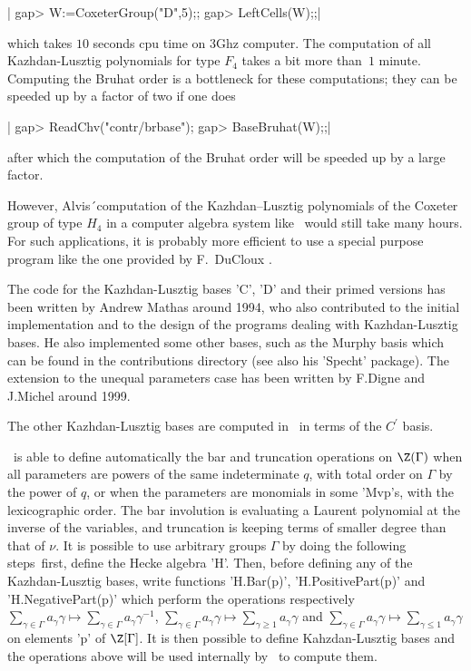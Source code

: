 |    gap> W:=CoxeterGroup("D",5);;
    gap> LeftCells(W);;|

which  takes $10$ seconds cpu time on 3Ghz computer. The computation of all
Kazhdan-Lusztig  polynomials  for  type  $F_4$  takes  a  bit more than~$1$
minute.  Computing the Bruhat order is a bottleneck for these computations;
they can be speeded up by a factor of two if one does\:

|    gap> ReadChv("contr/brbase");
    gap> BaseBruhat(W);;|

after  which the computation  of the Bruhat  order will be  speeded up by a
large factor.

However,  Alvis\'\ computation  of the  Kazhdan--Lusztig polynomials of the
Coxeter  group of type $H_4$ in a  computer algebra system like \GAP\ would
still take many hours. For such applications, it is probably more efficient
to  use a  special purpose  program like  the one  provided by  F.\ DuCloux
\cite{DuC91}.

The  code for the Kazhdan-Lusztig bases  'C', 'D' and their primed versions
has  been written by Andrew Mathas around 1994, who also contributed to the
initial  implementation  and  to  the  design  of the programs dealing with
Kazhdan-Lusztig  bases. He also  implemented some other  bases, such as the
Murphy  basis which can  be found in  the contributions directory (see also
his  'Specht' package).  The extension  to the  unequal parameters case has
been written by F.Digne and J.Michel around 1999.

The  other Kazhdan-Lusztig bases  are computed in  \CHEVIE\ in terms of the
$C^\prime$ basis.

\CHEVIE\  is able to define automatically the bar and truncation operations
on  $\Z(\Gamma)$ when all  parameters are powers  of the same indeterminate
$q$,  with  total  order  on  $\Gamma$  by  the  power  of $q$, or when the
parameters  are monomials in some 'Mvp's, with the lexicographic order. The
bar  involution is  evaluating a  Laurent polynomial  at the inverse of the
variables,  and truncation is keeping terms  of smaller degree than that of
$\nu$.  It  is  possible  to  use  arbitrary  groups  $\Gamma$ by doing the
following  steps\:\  first,  define  the  Hecke  algebra  'H'. Then, before
defining  any  of  the  Kazhdan-Lusztig  bases, write functions 'H.Bar(p)',
'H.PositivePart(p)'  and 'H.NegativePart(p)'  which perform  the operations
respectively $\sum_{\gamma\in\Gamma} a_\gamma\gamma\mapsto
\sum_{\gamma\in\Gamma}     a_\gamma\gamma^{-1}$,    $\sum_{\gamma\in\Gamma}
a_\gamma\gamma\mapsto     \sum_{\gamma\ge     1}     a_\gamma\gamma$    and
$\sum_{\gamma\in\Gamma}     a_\gamma\gamma\mapsto     \sum_{\gamma\le    1}
a_\gamma\gamma$  on elements  'p' of  $\Z[\Gamma]$. It  is then possible to
define  Kahzdan-Lusztig  bases  and  the  operations  above  will  be  used
internally by \CHEVIE\ to compute them.

